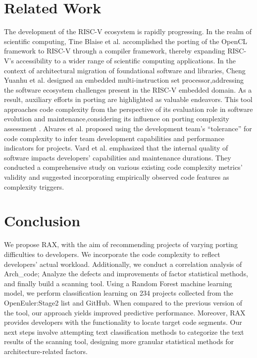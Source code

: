 \documentclass[sigconf,screen,review]{acmart}
\begin{document}
\section{Related Work}
The development of the RISC-V ecosystem is rapidly progressing.
In the realm of scientific computing, Tine Blaise et al. \cite{osti_1830102} accomplished the porting of the OpenCL framework to RISC-V through a compiler framework, thereby expanding RISC-V's accessibility to a wider range of scientific computing applications.
In the context of architectural migration of foundational software and libraries, Cheng Yuanhu et al. \cite{2017Slow} designed an embedded multi-instruction set processor,addressing the software ecosystem challenges present in the RISC-V embedded domain.
As a result, auxiliary efforts in porting are highlighted as valuable endeavors.
This tool approaches code complexity from the perspective of its evaluation role in software evolution and maintenance,considering its influence on porting complexity assessment \cite{1993Software}.
Alvares et al. \cite{7844689} proposed using the development team's ``tolerance'' for code complexity to infer team development capabilities and performance indicators for projects.
Vard et al. \cite{2017Evaluating} emphasized that the internal quality of software impacts developers' capabilities and maintenance durations.
They conducted a comprehensive study on various existing code complexity metrics' validity and suggested incorporating empirically observed code features as complexity triggers.

\section{Conclusion}
We propose RAX, with the aim of recommending projects of varying porting difficulties to developers.
We incorporate the code complexity to reflect developers' actual workload.
Additionally, we conduct a correlation analysis of Arch\_code; Analyze the defects and improvements of factor statistical methods, and finally build a scanning tool.
Using a Random Forest machine learning model, we perform classification learning on 234 projects collected from the OpenEuler:Stage2 list and GitHub.
When compared to the previous version of the tool, our approach yields improved predictive performance.
Moreover, RAX provides developers with the functionality to locate target code segments.
Our next steps involve attempting text classification methods to categorize the text results of the scanning tool, designing more granular statistical methods for architecture-related factors.
\end{document}
